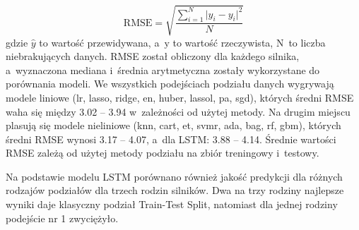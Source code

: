 \begin{equation}
    \mathrm{RMSE} = \sqrt{\frac{\sum_{i=1}^{N} \lvert \hat{y}_i - y_i \rvert^{2}}{N}}
    \label{eq:rmse}
\end{equation}
gdzie $\hat{y}$ to wartość przewidywana, a~$\mathrm{y}$ to wartość rzeczywista, N~to liczba niebrakujących danych. RMSE został obliczony dla każdego silnika, a~wyznaczona mediana i~średnia arytmetyczna zostały wykorzystane do porównania modeli.
We wszystkich podejściach podziału danych wygrywają modele liniowe (lr, lasso, ridge, en, huber, lassol, pa, sgd), których średni RMSE waha się między 3.02 – 3.94 w~zależności od użytej metody. Na drugim miejscu plasują się modele nieliniowe (knn, cart, et, svmr, ada, bag, rf, gbm), których średni RMSE wynosi 3.17 – 4.07, a~dla LSTM: 3.88 – 4.14. Średnie wartości RMSE zależą od użytej metody podziału na zbiór treningowy i~testowy.

Na podstawie modelu LSTM porównano również jakość predykcji dla różnych rodzajów podziałów dla trzech rodzin silników. Dwa na trzy rodziny najlepsze wyniki daje klasyczny podział Train-Test Split, natomiast dla jednej rodziny podejście nr 1 zwyciężyło.